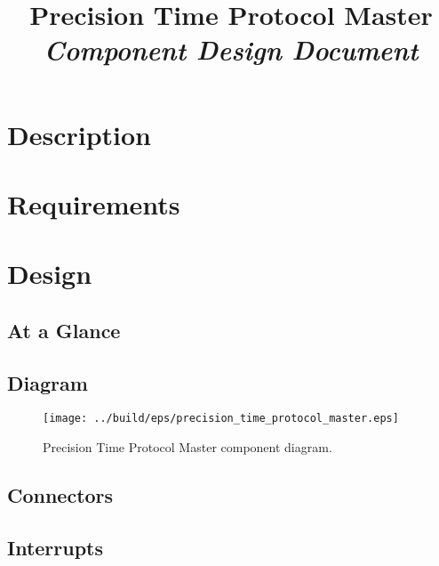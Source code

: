 



\title{\textbf{Precision Time Protocol Master} \\
\large\textit{Component Design Document}}
\date{}
\maketitle

\section{Description}


\section{Requirements}


\section{Design}

\subsection{At a Glance}


\subsection{Diagram}
\begin{figure}[H]
  \texttt{[image: ../build/eps/precision\_time\_protocol\_master.eps]}
  \caption{Precision Time Protocol Master component diagram.}
\end{figure}

\subsection{Connectors}


\subsection{Interrupts}



